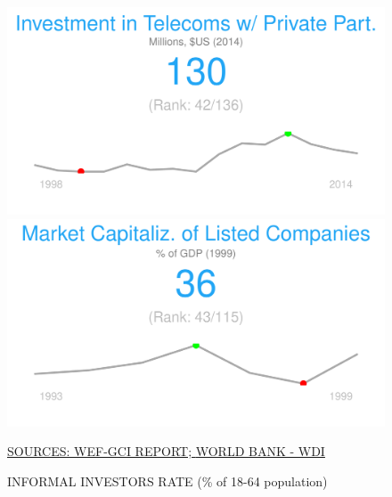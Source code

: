 \documentclass{article}\usepackage[]{graphicx}\usepackage[]{color}
\makeatletter
\def\maxwidth{ %
  \ifdim\Gin@nat@width>\linewidth
    \linewidth
  \else
    \Gin@nat@width
  \fi
}
\makeatother
\begin{document}
\begin{figure}
\begin{minipage}[c]{0.95\textwidth}
\begin{minipage}[c]{0.95\textwidth}
\begin{minipage}[c]{0.32\textwidth}
{\centering \includegraphics[width=\maxwidth]{figure/figure_sparkline_Fin2-1} 

}



      \end{minipage}
      \begin{minipage}[c]{0.32\textwidth}


{\centering \includegraphics[width=\maxwidth]{figure/figure_sparkline_Fin3-1} 

}



      \end{minipage}
       \hspace{4ex}\scriptsize{\href{http://www3.weforum.org/docs/gcr/2015-2016/GCI_Dataset_2006-2015.xlsx}{\textcolor[HTML]{22A6F5}{SOURCES: WEF-GCI REPORT; }}\href{http://data.worldbank.org}{\textcolor[HTML]{22A6F5}{WORLD BANK - WDI}}}
  \end{minipage}
    
  \begin{minipage}[c]{0.95\textwidth} %
    \vspace*{0.6cm}
    \begin{minipage}[c]{0.49\textwidth} %
      \small{\textcolor[HTML]{818181}{INFORMAL INVESTORS RATE \footnotesize(\% of 18-64 population)}}



\end{minipage}
\end{minipage}
\end{minipage}
\end{figure}
\end{document}
